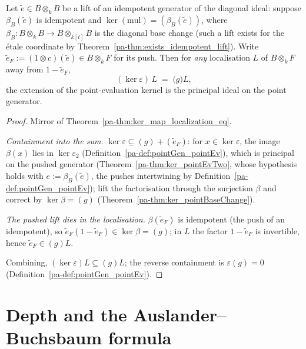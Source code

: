 \begin{theorem}
  \label{pa-thm:ker_pointEv_map_localization_eq}
  \leanok

  Let \(\tilde e \in B \otimes_k B\) be a lift of an idempotent generator of the diagonal
  ideal: suppose \(\beta_B(\tilde e)\) is idempotent and
  \(\ker(\mathrm{mul}) = (\beta_B(\tilde e))\), where
  \(\beta_B \colon B \otimes_k B \to B \otimes_{k[t]} B\) is the diagonal base change (such
  a lift exists for the \'etale coordinate by Theorem~\ref{pa-thm:exists_idempotent_lift}).
  Write \(\tilde e_F := (1 \otimes c)(\tilde e) \in B \otimes_k F\) for its push. Then for
  \emph{any} localisation \(L\) of \(B \otimes_k F\) away from \(1 - \tilde e_F\),
  \[
    (\ker \varepsilon)\, L \;=\; \bigl(g\bigr) L ,
  \]
  the extension of the point-evaluation kernel is the principal ideal on the point
  generator.
\end{theorem}
\begin{proof}
  \leanok
  Mirror of Theorem~\ref{pa-thm:ker_map_localization_eq}.

  \emph{Containment into the sum.} \(\ker\varepsilon \subseteq (g) + (\tilde e_F)\): for
  \(x \in \ker\varepsilon\), the image \(\beta(x)\) lies in \(\ker\varepsilon_2\)
  (Definition~\ref{pa-def:pointGen_pointEv}), which is principal on the pushed generator
  (Theorem~\ref{pa-thm:ker_pointEvTwo}, whose hypothesis holds with
  \(e := \beta_B(\tilde e)\), the pushes intertwining by
  Definition~\ref{pa-def:pointGen_pointEv}); lift the factorisation through the surjection
  \(\beta\) and correct by \(\ker\beta = (g)\) (Theorem~\ref{pa-thm:ker_pointBaseChange}).

  \emph{The pushed lift dies in the localisation.} \(\beta(\tilde e_F)\) is idempotent (the
  push of an idempotent), so \(\tilde e_F (1 - \tilde e_F) \in \ker\beta = (g)\); in \(L\)
  the factor \(1 - \tilde e_F\) is invertible, hence \(\tilde e_F \in (g)L\).

  Combining, \((\ker\varepsilon)L \subseteq (g)L\); the reverse containment is
  \(\varepsilon(g) = 0\) (Definition~\ref{pa-def:pointGen_pointEv}).
\end{proof}

\section{Depth and the Auslander--Buchsbaum formula}
\label{pa-sec:auslander_buchsbaum}

